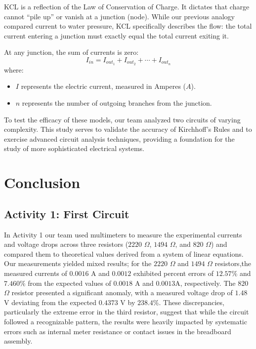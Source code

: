 \documentclass[12pt]{article}
\begin{document}
KCL is a reflection of the Law of Conservation of Charge. It dictates that
charge cannot ``pile up'' or vanish at a junction (node). While our previous
analogy compared current to water pressure, KCL specifically describes the flow:
the total current entering a junction must exactly equal the total current
exiting it.

At any junction, the sum of currents is zero:
\begin{equation*}
    I_{in} = I_{out_1} + I_{out_2} + \cdots + I_{out_n}
  \end{equation*}
where:
\begin{itemize}
  \item $I$ represents the electric current, measured in Amperes ($A$).
  \item $n$ represents the number of outgoing branches from the junction.
\end{itemize}

To test the efficacy of these models, our team analyzed two circuits of varying
complexity. This study serves to validate the accuracy of Kirchhoff’s Rules and
to exercise advanced circuit analysis techniques, providing a foundation for the
study of more sophisticated electrical systems.

\section{Conclusion}
\subsection*{Activity 1: First Circuit}
In Activity 1 our team used multimeters to measure the experimental currents and
voltage drops across three resistors ($2220$ $\Omega$, $1494$ $\Omega$,
and $820$ $\Omega$) and compared them to theoretical values derived from a
system of linear equations. Our measurements yielded mixed results; for
the $2220$ $\Omega$ and $1494$ $\Omega$ resistors,the measured currents
of $0.0016$ A and $0.0012$ exhibited percent errors of $12.57\%$ and $7.460\%$
from the expected values of $0.0018$ A and $0.0013$A, respectively.
The $820$ $\Omega$ resistor presented a significant anomaly, with a measured
voltage drop of $1.48$ V deviating from the expected $0.4373$ V by $238.4\%$.
These discrepancies, particularly the extreme error in the third resistor,
suggest that while the circuit followed a recognizable pattern, the results were
heavily impacted by systematic errors such as internal meter resistance or
contact issues in the breadboard assembly.
\end{document}
